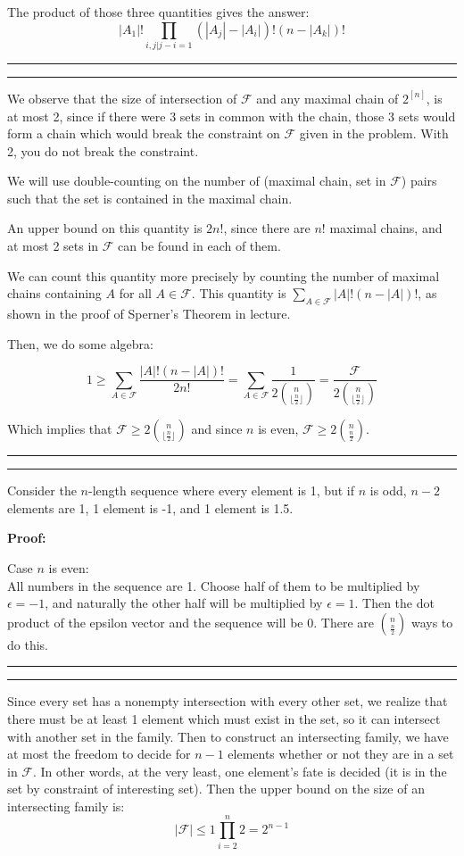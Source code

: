 \documentclass[11pt,letterpaper]{article}
\newcommand{\question}[1] {\vspace{.25in} \hrule\vspace{0.5em}
\noindent{\bf #1} \vspace{0.5em}
\hrule \vspace{.10in}}
\begin{document}
The product of those three quantities gives the answer:
$$|A_1|!\prod_{i,j | j-i = 1} (|A_j| - |A_i|)!(n - |A_k|)!$$

\question{2}
We observe that the size of intersection of $\mathcal{F}$ and any maximal chain of $2^{[n]}$,
is at most 2, since if there were 3 sets in common with the chain,
those 3 sets would form a chain which would break the constraint on $\mathcal{F}$ given in the problem.
With 2, you do not break the constraint.

We will use double-counting on the number of (maximal chain, set in $\mathcal{F}$) pairs such that the set is contained in the maximal chain.

An upper bound on this quantity is $2n!$, since there are $n!$ maximal chains, and at most 2 sets in $\mathcal{F}$ can be found in each of them.

We can count this quantity more precisely by counting the number of maximal chains containing $A$ for all $A \in \mathcal{F}$.
This quantity is $\sum_{A \in \mathcal{F}} |A|!(n-|A|)!$, as shown in the proof of Sperner's Theorem in lecture.

Then, we do some algebra:

$$ 1 \geq \sum_{A \in \mathcal{F}} \frac{|A|!(n-|A|)!}{2n!} = \sum_{A \in \mathcal{F}} \frac{1}{2{n \choose \lfloor \frac{n}{2} \rfloor }} = \frac{\mathcal{F}}{2{n \choose \lfloor \frac{n}{2} \rfloor }}$$

Which implies that $\mathcal{F} \geq 2{n \choose \lfloor \frac{n}{2} \rfloor }$ and since $n$ is even, $\mathcal{F} \geq 2{n \choose \frac{n}{2}}$.


\question{3}
Consider the $n$-length sequence where every element is 1, but if $n$ is odd, $n-2$ elements are 1, 1 element is -1, and 1 element is 1.5.

\textbf{Proof:}

Case $n$ is even:\\
All numbers in the sequence are 1. Choose half of them to be multiplied by $\epsilon = -1$, and naturally the other half will be multiplied by $\epsilon = 1$.
Then the dot product of the epsilon vector and the sequence will be $0$. There are ${n \choose \frac{n}{2}}$ ways to do this.


\question{4}
Since every set has a nonempty intersection with every other set, we realize that there must be at least 1 element which must exist in the set, so it can intersect with another set in the family.
Then to construct an intersecting family, we have at most the freedom to decide for $n-1$ elements whether or not they are in a set in $\mathcal{F}$. In other words, at the very least, one element's fate is decided (it is in the set by constraint of interesting set).
Then the upper bound on the size of an intersecting family is:
$$ |\mathcal{F}| \leq 1 \prod_{i=2}^{n} 2 = 2^{n-1}$$
\end{document}
